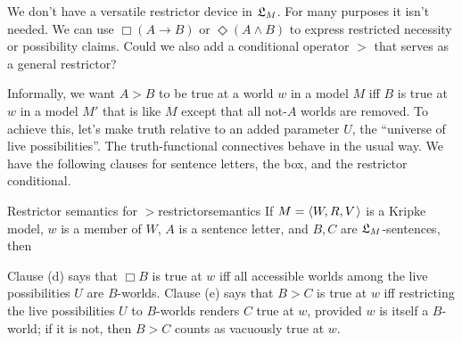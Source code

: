 \iffalse

We don't have a versatile restrictor device in $\mathfrak{L}_{M}$. For many purposes it
isn't needed. We can use $\Box(A \to B)$ or $\Diamond(A \land B)$ to express
restricted necessity or possibility claims. Could we also add a conditional
operator $>$ that serves as a general restrictor?

Informally, we want $A > B$ to be true at a world $w$ in a model $M$ iff $B$ is
true at $w$ in a model $M'$ that is like $M$ except that all not-$A$ worlds are
removed. To achieve this, let's make truth relative to an added parameter $U$,
the ``universe of live possibilities''. The truth-functional connectives behave
in the usual way. We have the following clauses for sentence letters, the box,
and the restrictor conditional.

\begin{definition}{Restrictor semantics for $>$}{restrictorsemantics}
  If $\Mfr = \t{W,R,V}$ is a Kripke model, $w$ is a member of $W$, $A$ is a
  sentence letter, and $B,C$ are $\mathfrak{L}_M$-sentences, then \medskip
  \begin{semantics}
  \end{semantics}
\end{definition}
%
Clause (d) says that $\Box
B$ is true at $w$ iff all accessible worlds among the live possibilities $U$ are $B$-worlds. Clause (e) says that $B
>
C$ is true at $w$ iff restricting the live possibilities $U$ to $B$-worlds renders $C$ true at $w$, provided $w$ is itself a $B$-world; if it is not, then $B
> C$ counts as vacuously true at $w$. 

